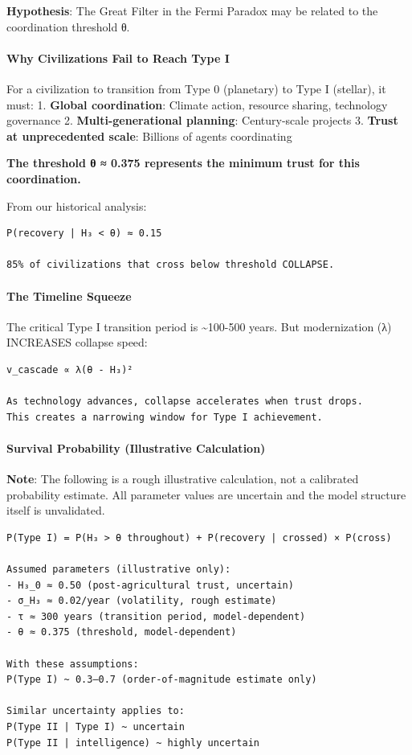 \documentclass[11pt,letterpaper]{article}
\begin{document}
\textbf{Hypothesis}: The Great Filter in the Fermi Paradox may be
related to the coordination threshold θ.

\paragraph{Why Civilizations Fail to Reach Type
I}\label{why-civilizations-fail-to-reach-type-i}

For a civilization to transition from Type 0 (planetary) to Type I
(stellar), it must: 1. \textbf{Global coordination}: Climate action,
resource sharing, technology governance 2. \textbf{Multi-generational
planning}: Century-scale projects 3. \textbf{Trust at unprecedented
scale}: Billions of agents coordinating

\textbf{The threshold θ ≈ 0.375 represents the minimum trust for this
coordination.}

From our historical analysis:

\begin{verbatim}
P(recovery | H₃ < θ) ≈ 0.15

85% of civilizations that cross below threshold COLLAPSE.
\end{verbatim}

\paragraph{The Timeline Squeeze}\label{the-timeline-squeeze}

The critical Type I transition period is \textasciitilde100-500 years.
But modernization (λ) INCREASES collapse speed:

\begin{verbatim}
v_cascade ∝ λ(θ - H₃)²

As technology advances, collapse accelerates when trust drops.
This creates a narrowing window for Type I achievement.
\end{verbatim}

\paragraph{Survival Probability (Illustrative
Calculation)}\label{survival-probability-illustrative-calculation}

\textbf{Note}: The following is a rough illustrative calculation, not a
calibrated probability estimate. All parameter values are uncertain and
the model structure itself is unvalidated.

\begin{verbatim}
P(Type I) = P(H₃ > θ throughout) + P(recovery | crossed) × P(cross)

Assumed parameters (illustrative only):
- H₃_0 ≈ 0.50 (post-agricultural trust, uncertain)
- σ_H₃ ≈ 0.02/year (volatility, rough estimate)
- τ ≈ 300 years (transition period, model-dependent)
- θ ≈ 0.375 (threshold, model-dependent)

With these assumptions:
P(Type I) ~ 0.3–0.7 (order-of-magnitude estimate only)

Similar uncertainty applies to:
P(Type II | Type I) ~ uncertain
P(Type II | intelligence) ~ highly uncertain
\end{verbatim}
\end{document}
